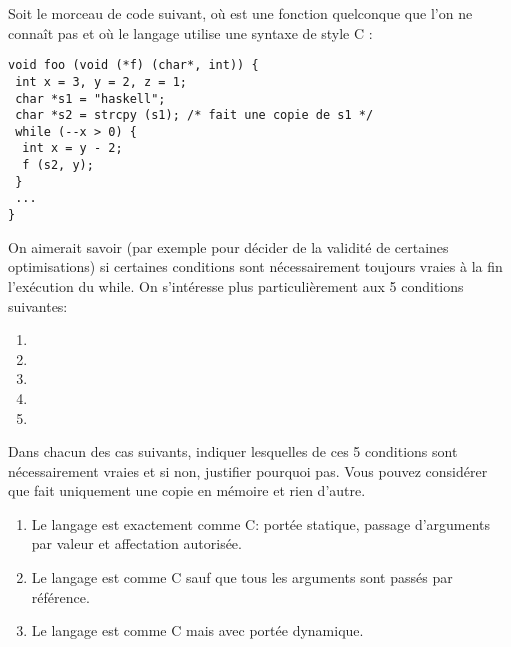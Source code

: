 \begin{Exercise}
\label{ex:fonction_raisonner3}
  Soit le morceau de code suivant, où  est une fonction
quelconque que l'on ne connaît pas et où le langage utilise une
syntaxe de style C :
\begin{verbatim}
void foo (void (*f) (char*, int)) {
 int x = 3, y = 2, z = 1;
 char *s1 = "haskell";
 char *s2 = strcpy (s1); /* fait une copie de s1 */
 while (--x > 0) {
  int x = y - 2;
  f (s2, y);
 }
 ...
}
\end{verbatim}
On aimerait savoir (par exemple pour décider de la validité de
certaines optimisations) si certaines conditions sont nécessairement
toujours vraies à la fin l'exécution du while.  On s'intéresse plus
particulièrement aux 5 conditions suivantes:
\begin{enumerate}
\item {}
\item {}
\item {}
\item {}
\item {}
\end{enumerate}
Dans chacun des cas suivants, indiquer lesquelles de ces 5 conditions
sont nécessairement vraies et si non, justifier pourquoi pas. Vous
pouvez considérer que  fait uniquement une copie en mémoire et
rien d'autre.
\begin{enumerate}
\item Le langage est exactement comme C: portée statique, passage d'arguments
  par valeur et affectation autorisée.
\item Le langage est comme C sauf que tous les arguments sont passés
  par référence.
\item Le langage est comme C mais avec portée dynamique.
\end{enumerate}
\end{Exercise}

